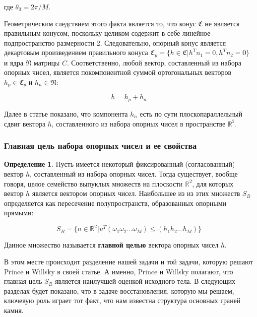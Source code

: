 \documentclass[a4paper, 12pt, titlepage]{article}
\theoremstyle{definition}
\newtheorem{SmartDefinition}{Определение}
\theoremstyle{plain}
\begin{document}
где $\theta_{0} = 2 \pi / M$.

Геометрическим следствием этого факта является то, что конус $\mathfrak{C}$ не
является правильным конусом, поскольку целиком содержит в себе линейное
подпространство размерности 2. Следовательно, опорный конус является декартовым
произведением правильного конуса
$\mathfrak{C}_{p} = \{h \in \mathfrak{C} | h^{T} n_{1} = 0, h^{T} n_{2} = 0\}$
и ядра $\mathfrak{N}$ матрицы $C$. Соответственно, любой вектор, составленный из
набора опорных чисел, является покомпонентной суммой ортогональных векторов
$h_{p} \in \mathfrak{C}_{p}$ и $h_{n} \in \mathfrak{N}$:

\begin{equation}
 h = h_{p} + h_{n}
\end{equation}

Далее в статье показано, что компонента $h_{n}$ есть по сути плоскопараллельный
сдвиг вектора $h$, составленного из набора опорных чисел в пространстве
$\mathbb{R}^{2}$.

\subsubsection{Главная цель набора опорных чисел и ее свойства}
\label{sec:history/PrinceW90/basic-object}

\begin{SmartDefinition}
 \label{def:basic-object}
 Пусть имеется некоторый фиксированный (согласованный) вектор $h$, составленный
 из набора опорных чисел. Тогда существует, вообще говоря, целое семейство
 выпуклых множеств на плоскости $\mathbb{R}^{2}$, для которых вектор $h$
 является вектором опорных чисел. Наибольшее из из этих множеств $S_{B}$ 
 определяется как пересечение полупространств, образованных опорными прямыми:

 \begin{equation}
 S_{B} = \{u \in \mathbb{R}^{2} |
 u^{T} (\omega_{1} \omega_{2} \ldots \omega_{M}) \leq
 (h_{1} h_{2} \ldots h_{M})\}
 \end{equation}

 Данное множество называется \textbf{главной целью} вектора опорных чисел $h$.
\end{SmartDefinition}

В этом месте происходит разделение нашей задачи и той задачи, которую решают
Prince и Willsky в своей статье. А именно, Prince и Willsky полагают, что
главная цель $S_{B}$ является наилучшей оценкой исходного тела. В следующих
разделах будет показано, что в задаче восстановления, которую мы решаем,
ключевую роль играет тот факт, что нам известна структура основных граней камня.
\end{document}
